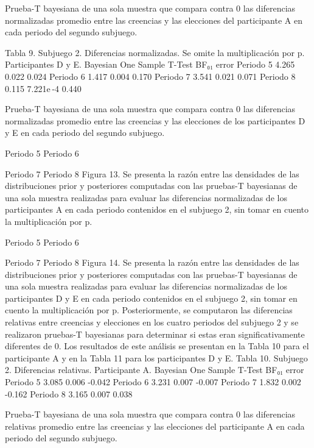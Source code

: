 Prueba-T bayesiana de una sola muestra que compara contra 0 las diferencias normalizadas promedio entre las creencias y las elecciones del participante A en cada periodo del segundo subjuego.

Tabla 9. Subjuego 2. Diferencias normalizadas. Se omite la multiplicación por p. Participantes D y E.
Bayesian One Sample T-Test	
	BF₀₁	error %
Periodo 5		4.265		0.022		0.024 
Periodo 6		1.417		0.004		0.170 
Periodo 7		3.541		0.021		0.071 
Periodo 8		0.115		7.221e -4		0.440 
	
Prueba-T bayesiana de una sola muestra que compara contra 0 las diferencias normalizadas promedio entre las creencias y las elecciones de los participantes D y E en cada periodo del segundo subjuego.

  
        Periodo 5					        Periodo 6
  
         Periodo 7					         Periodo 8
Figura 13. Se presenta la razón entre las densidades de las distribuciones prior y posteriores  computadas con las pruebas-T bayesianas de una sola muestra realizadas para evaluar las diferencias normalizadas de los participantes A en cada periodo contenidos en el subjuego 2, sin tomar en cuento la multiplicación por p.

  
         Periodo 5					         Periodo 6
  
           Periodo 7				             	         Periodo 8
Figura 14. Se presenta la razón entre las densidades de las distribuciones prior y posteriores  computadas con las pruebas-T bayesianas de una sola muestra realizadas para evaluar las diferencias normalizadas de los participantes D y E en cada periodo contenidos en el subjuego 2, sin tomar en cuento la multiplicación por p.
Posteriormente, se computaron las diferencias relativas entre creencias y elecciones en los cuatro periodos del subjuego 2 y se realizaron pruebas-T bayesianas para determinar si estas eran significativamente diferentes de 0. Los resultados de este análisis se presentan en la Tabla 10 para el participante A y en la Tabla 11 para los participantes D y E.
Tabla 10. Subjuego 2. Diferencias relativas. Participante A.
Bayesian One Sample T-Test 	
  	BF₀₁ 	error %
Periodo 5 		3.085 		0.006 		-0.042 
Periodo 6 		3.231 		0.007 		-0.007 
Periodo 7 		1.832 		0.002 		-0.162 
Periodo 8 		3.165 		0.007 		0.038 
	
Prueba-T bayesiana de una sola muestra que compara contra 0 las diferencias relativas promedio entre las creencias y las elecciones del participante A en cada periodo del segundo subjuego.

